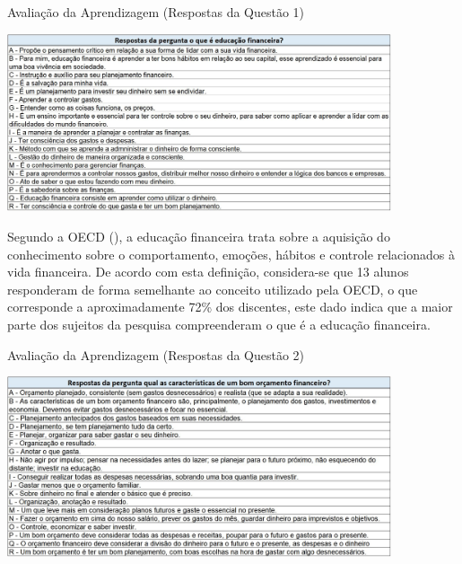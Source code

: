\graphicspath{{quadros/}} 
\begin{quadro}[!ht]
\centering
\begin{minipage}{0.8\textwidth}
\caption{Avaliação da Aprendizagem (Respostas da Questão 1)}
\centering
\includegraphics[width=0.85\textwidth]{quadro-21-Respostas pergunta1.JPG}
\label{quad: quadro-21-Respostas  pergunta1}
\end{minipage}
\end{quadro}

Segundo a OECD (\citeyear{oecd2005}), a educação financeira trata sobre a aquisição do conhecimento sobre o comportamento, emoções, hábitos e controle relacionados à vida financeira. De acordo com esta definição, considera-se que 13 alunos responderam de forma semelhante ao conceito utilizado pela OECD, o que corresponde a aproximadamente 72\% dos discentes, este dado indica que a maior parte dos sujeitos da pesquisa compreenderam o que é a educação financeira.

\graphicspath{{quadros/}} 
\begin{quadro}[!ht]
\centering
\begin{minipage}{0.8\textwidth}
\caption{Avaliação da Aprendizagem (Respostas da Questão 2)}
\centering
\includegraphics[width=0.85\textwidth]{quadro-22-Respostas-pergunta2}
\label{quad: quadro-22-Respostas  pergunta2}
\end{minipage}
\end{quadro}

